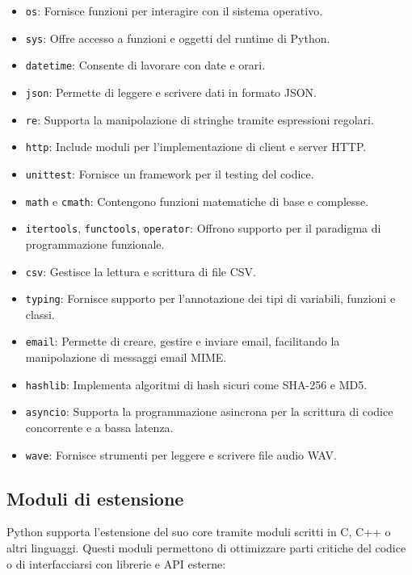\documentclass[
  letterpaper,
]{scrbook}
\providecommand{\tightlist}{%
  \setlength{\itemsep}{0pt}\setlength{\parskip}{0pt}}\usepackage{longtable,booktabs,array}
\begin{document}
\begin{itemize}
\tightlist
\item
  \texttt{os}: Fornisce funzioni per interagire con il sistema
  operativo.
\item
  \texttt{sys}: Offre accesso a funzioni e oggetti del runtime di
  Python.
\item
  \texttt{datetime}: Consente di lavorare con date e orari.
\item
  \texttt{json}: Permette di leggere e scrivere dati in formato JSON.
\item
  \texttt{re}: Supporta la manipolazione di stringhe tramite espressioni
  regolari.
\item
  \texttt{http}: Include moduli per l'implementazione di client e server
  HTTP.
\item
  \texttt{unittest}: Fornisce un framework per il testing del codice.
\item
  \texttt{math} e \texttt{cmath}: Contengono funzioni matematiche di
  base e complesse.
\item
  \texttt{itertools}, \texttt{functools}, \texttt{operator}: Offrono
  supporto per il paradigma di programmazione funzionale.
\item
  \texttt{csv}: Gestisce la lettura e scrittura di file CSV.
\item
  \texttt{typing}: Fornisce supporto per l'annotazione dei tipi di
  variabili, funzioni e classi.
\item
  \texttt{email}: Permette di creare, gestire e inviare email,
  facilitando la manipolazione di messaggi email MIME.
\item
  \texttt{hashlib}: Implementa algoritmi di hash sicuri come SHA-256 e
  MD5.
\item
  \texttt{asyncio}: Supporta la programmazione asincrona per la
  scrittura di codice concorrente e a bassa latenza.
\item
  \texttt{wave}: Fornisce strumenti per leggere e scrivere file audio
  WAV.
\end{itemize}

\subsection{Moduli di estensione}\label{moduli-di-estensione}

Python supporta l'estensione del suo core tramite moduli scritti in C,
C++ o altri linguaggi. Questi moduli permettono di ottimizzare parti
critiche del codice o di interfacciarsi con librerie e API esterne:
\end{document}
